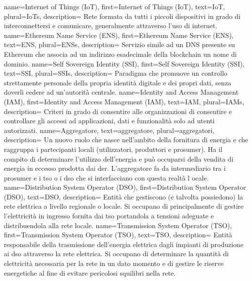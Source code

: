{
    name={Internet of Things (IoT)},
    first={Internet of Things (IoT)},
    text={IoT},
    plural={IoTs},
    description={
            Rete formata da tutti i piccoli dispositivi in grado di interconnettersi e comunicare,
            generalmente attraverso l'uso di internet.
        }
}
{
    name={Ethereum Name Service (ENS)},
    first={Ethereum Name Service (ENS)},
    text={ENS},
    plural={ENSs},
    description={
            Servizio simile ad un DNS presente su Ethereum che associa ad un indirizzo esadecimale della blockchain un nome di dominio.
        }
}
{
    name={Self Sovereign Identity (SSI)},
    first={Self Sovereign Identity (SSI)},
    text={SSI},
    plural={SSIs},
    description={
            Paradigma che promuove un controllo strettamente personale della propria identità digitale e dei propri dati,
            senza doverli cedere ad un'autorità centrale.
        }
}
{
    name={Identity and Access Management (IAM)},
    first={Identity and Access Management (IAM)},
    text={IAM},
    plural={IAMs},
    description={
            Criteri in grado di consentire alle organizzazioni di consentire e controllare gli accessi ad applicazioni,
            dati e funzionalità solo ad utenti autorizzati.
        }
}
{
    name={Aggregatore},
    text={aggregatore},
    plural={aggregatori},
    description={
            Un nuovo ruolo che nasce nell'ambito della fornitura di energia e che raggruppa i partecipanti locali (utilizzatori, produttori e \gls{prosumer}). Ha il compito di determinare l'utilizzo dell'energia e può occuparsi della vendita di energia in eccesso prodotta dai \gls{der}.
            L'aggregatore fa da intermediario tra i \gls{prosumer} e i \gls{tso} o i \gls{dso} che si interfacciano con questa realtà l ocale.
        }
}
{
    name={Distribution System Operator (DSO)},
    first={Distribution System Operator (DSO)},
    text={DSO},
    description={
            Entità che gestiscono (e talvolta possiedono) la rete elettrica a livello regionale o locale.
            Si occupano di principalmente di gestire l'elettricità in ingresso fornita dai \gls{tso} portandola a tensioni adeguate e distribuendola alla rete locale.
        }
}
{
    name={Transmission System Operator (TSO)},
    first={Transmission System Operator (TSO)},
    text={TSO},
    description={
            Entità responsabile della trasmissione dell'energia elettrica dagli impianti di produzione ai \gls{dso} attraverso la rete elettrica.
            Si occupano di determinare la quantità di elettricità necessaria per la rete in un dato momento e di gestire le riserve energetiche al fine di evitare pericolosi squilibri nella rete.
        }
}
